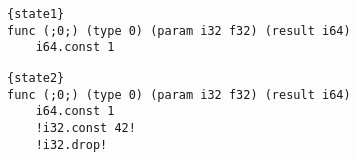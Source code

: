 
   \begin{minipage}[t]{0.45\linewidth}
    \lstset{
        language=WAT,
                        style=watcode,
        basicstyle=\footnotesize\ttfamily,
                        columns=fullflexible,
                        breaklines=true}
        
        \begin{lstlisting}[label=example:state1,caption={Program P.},frame=b, captionpos=b]{state1}
func (;0;) (type 0) (param i32 f32) (result i64)
    i64.const 1
        \end{lstlisting}
\end{minipage}\hfill
\begin{minipage}[t]{0.45\linewidth}
    \lstset{
        language=WAT,
                        style=watcode,
        basicstyle=\footnotesize\ttfamily,
                        columns=fullflexible,
                        breaklines=true}
        
        \begin{lstlisting}[label=example:state2,caption={Program $P'$, transformation of program $P$.},frame=b, captionpos=b]{state2}
func (;0;) (type 0) (param i32 f32) (result i64)
    i64.const 1
    !i32.const 42!
    !i32.drop!
        \end{lstlisting}
\end{minipage}
